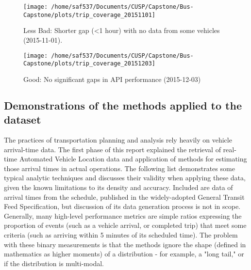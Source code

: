 \documentclass[12pt]{report}
\begin{document}
\begin{figure}[!ht]
  \caption{Less Bad: Shorter gap (<1 hour) with no data from some vehicles (2015-11-01).}
  \centering
    \texttt{[image: /home/saf537/Documents/CUSP/Capstone/Bus-Capstone/plots/trip\_coverage\_20151101]}
\end{figure}


\begin{figure}[!ht]
  \caption{Good: No significant gaps in API performance (2015-12-03)}
  \centering
    \texttt{[image: /home/saf537/Documents/CUSP/Capstone/Bus-Capstone/plots/trip\_coverage\_20151203]}
\end{figure}


\subsection{Demonstrations of the methods applied to the dataset}

The practices of transportation planning and analysis rely heavily on vehicle arrival-time data.  The first phase of this report explained the retrieval of real-time Automated Vehicle Location data and application of methods for estimating those arrival times in actual operations.  The following list demonstrates some typical analytic techniques and discusses their validity when applying these data, given the known limitations to its density and accuracy.  Included are data of arrival times from the schedule, published in the widely-adopted General Transit Feed Specification, but discussion of its data generation process is not in scope.  Generally, many high-level performance metrics are simple ratios expressing the proportion of events (such as a vehicle arrival, or completed trip) that meet some criteria (such as arriving within 5 minutes of its scheduled time).  The problem with these binary measurements is that the methods ignore the shape (defined in mathematics as higher moments) of a distribution - for example, a "long tail," or if the distribution is multi-modal.
\end{document}
